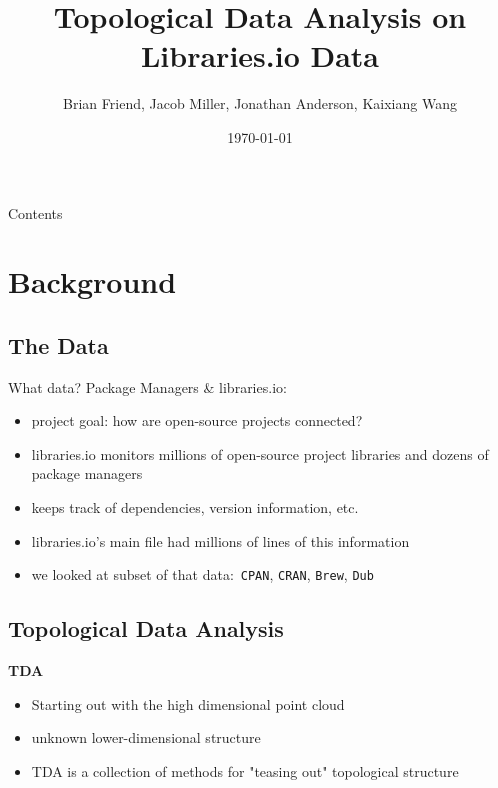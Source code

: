 \documentclass{beamer}
\theoremstyle{definition}
\theoremstyle{example}
\theoremstyle{conjecture}
\def\code#1{\texttt{#1}} %
\begin{document}
\title{Topological Data Analysis on Libraries.io Data}
\author{Brian Friend, Jacob Miller, Jonathan Anderson, Kaixiang Wang}
\date{\today}

\begin{frame}
\maketitle
\end{frame}

\begin{frame}{Contents}
\small{
\tableofcontents
}
\end{frame}

\section{Background}
\label{sc.background}
\subsection{The Data}
\label{subsc.datasource}
\begin{frame}{What data?}
Package Managers \& libraries.io:
  \begin{itemize}
  	\item project goal: how are open-source projects connected?
    \item libraries.io monitors millions of open-source project libraries 
    	  and dozens of package managers
    \item keeps track of dependencies, version information, etc.
    \item libraries.io's main file had millions of lines of this information
    \item we looked at subset of that data:\
          \code{CPAN}, \code{CRAN}, \code{Brew}, \code{Dub}
  \end{itemize}
\end{frame}

\subsection{Topological Data Analysis}
\label{subsc.tdabackground}
\begin{frame}
\textbf{TDA}
  \begin{itemize}
    \item Starting out with the high dimensional point cloud
    \item unknown lower-dimensional structure
    \item TDA is a collection of methods for "teasing out" topological structure
  \end{itemize}
\end{frame}
\end{document}
